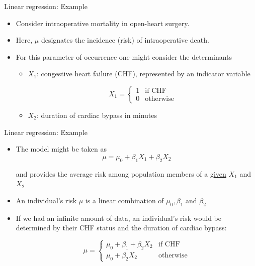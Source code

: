 \documentclass{beamer}\usepackage[]{graphicx}\usepackage[]{color}
\begin{document}
\begin{frame}{Linear regression: Example}

\begin{itemize}
	\setlength\itemsep{2em}
	\item Consider intraoperative mortality in open-heart surgery. 
	\item Here, $\mu$ designates the incidence (risk) of intraoperative death. \pause 
	\item For this parameter of occurrence one might consider the determinants 
	\begin{itemize}
		\item $X_1$: congestive heart failure (CHF), represented by an indicator variable
		
$$
X_1 = \begin{cases}
1 & \textrm{if CHF}\\
0 & \textrm{otherwise}
\end{cases}
$$
		\pause
		\item $X_2$: duration of cardiac bypass in minutes
	\end{itemize} 
	
\end{itemize}

\end{frame}



\begin{frame}{Linear regression: Example}

\begin{itemize}
	\setlength\itemsep{1.7em}
	\item The model might be taken as 
$$
\mu = \mu_0 + \beta_1 X_1 + \beta_2 X_2
$$

and provides the average risk among population members of a \underline{given} $X_1$ and $X_2$

\item An individual's risk $\mu$ is a linear combination of $\mu_0, \beta_1$ and $\beta_2$


\pause 

\item If we had an infinite amount of data, an individual's risk would be determined by their CHF status and the duration of cardiac bypass:

$$
\mu = \begin{cases}
\mu_0 + \beta_1 + \beta_2 X_2 &  \textrm{if CHF}\\
\mu_0 + \beta_2 X_2 &  \textrm{otherwise}
\end{cases}
$$
	
\end{itemize}

\end{frame}
\end{document}

